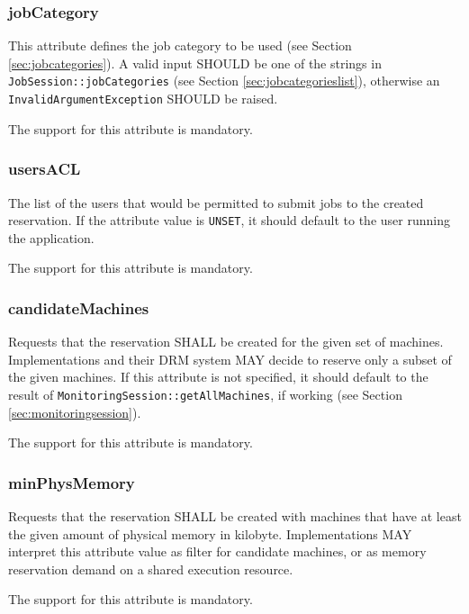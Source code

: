 \documentclass{article}
\newcommand{\h}[1]{\lstinline|#1|}
\newcommand{\rat}[1]{}
\begin{document}
\subsubsection{jobCategory}

This attribute defines the job category to be used (see Section \ref{sec:jobcategories}). A valid input SHOULD be one of the strings in \h{JobSession::jobCategories} (see Section \ref{sec:jobcategorieslist}), otherwise an \h{InvalidArgumentException} SHOULD be raised.

The support for this attribute is mandatory.

\subsubsection{usersACL}

The list of the users that would be permitted to submit jobs to the created reservation. If the attribute value is \h{UNSET}, it should default to the user running the application.

The support for this attribute is mandatory.

\subsubsection{candidateMachines}

Requests that the reservation SHALL be created for the given set of machines. Implementations and their DRM system MAY decide to reserve only a subset of the given machines. If this attribute is not specified, it should default to the result of \h{MonitoringSession::getAllMachines}, if working (see Section \ref{sec:monitoringsession}).

The support for this attribute is mandatory.

\rat{May 18th 2011 conf call identified the subset reservation feature to be only available in some of the systems, so it is no promise here.}

\subsubsection{minPhysMemory}

Requests that the reservation SHALL be created with machines that have at least the given amount of physical memory in kilobyte. Implementations MAY interpret this attribute value as filter for candidate machines, or as memory reservation demand on a shared execution resource.

The support for this attribute is mandatory.
\end{document}
